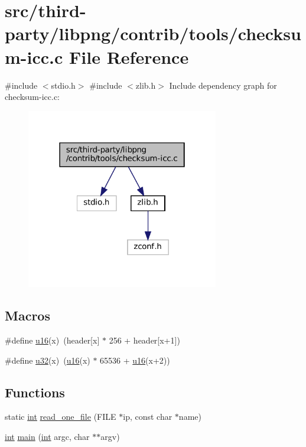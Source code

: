 \hypertarget{checksum-icc_8c}{}\section{src/third-\/party/libpng/contrib/tools/checksum-\/icc.c File Reference}
\label{checksum-icc_8c}
{\ttfamily \#include $<$stdio.\+h$>$}\newline
{\ttfamily \#include $<$zlib.\+h$>$}\newline
Include dependency graph for checksum-\/icc.c\+:
\nopagebreak
\begin{figure}[H]
\begin{center}
\leavevmode
\includegraphics[width=238pt]{checksum-icc_8c__incl}
\end{center}
\end{figure}
\subsection*{Macros}
\begin{DoxyCompactItemize}
\item 
\#define \mbox{\hyperlink{checksum-icc_8c_a5b2d6d159390c8e74c4adec23fafa19e}{u16}}(x)~(header\mbox{[}x\mbox{]} $\ast$ 256 + header\mbox{[}x+1\mbox{]})
\item 
\#define \mbox{\hyperlink{checksum-icc_8c_a296308971cf8c20a6557781461fc4982}{u32}}(x)~(\mbox{\hyperlink{sqlite3_8c_a20f2299e322dcbde37cb07b16910b843}{u16}}(x) $\ast$ 65536 + \mbox{\hyperlink{sqlite3_8c_a20f2299e322dcbde37cb07b16910b843}{u16}}(x+2))
\end{DoxyCompactItemize}
\subsection*{Functions}
\begin{DoxyCompactItemize}
\item 
static \mbox{\hyperlink{ioapi_8h_a787fa3cf048117ba7123753c1e74fcd6}{int}} \mbox{\hyperlink{checksum-icc_8c_a331b9d633652d9d4ec772d508909a64b}{read\+\_\+one\+\_\+file}} (F\+I\+LE $\ast$ip, const char $\ast$name)
\item 
\mbox{\hyperlink{ioapi_8h_a787fa3cf048117ba7123753c1e74fcd6}{int}} \mbox{\hyperlink{checksum-icc_8c_a3c04138a5bfe5d72780bb7e82a18e627}{main}} (\mbox{\hyperlink{ioapi_8h_a787fa3cf048117ba7123753c1e74fcd6}{int}} argc, char $\ast$$\ast$argv)
\end{DoxyCompactItemize}


